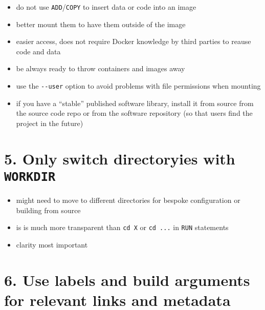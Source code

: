\documentclass[10pt,letterpaper]{article}
\providecommand{\tightlist}{%
  \setlength{\itemsep}{0pt}\setlength{\parskip}{0pt}}
\begin{document}
\begin{itemize}
\tightlist
\item
  do not use \texttt{ADD}/\texttt{COPY} to insert data or code into an
  image
\item
  better mount them to have them outside of the image
\item
  easier access, does not require Docker knowledge by third parties to
  reause code and data
\item
  be always ready to throw containers and images away
\item
  use the \texttt{-\/-user} option to avoid problems with file
  permissions when mounting
\item
  if you have a ``stable'' published software library, install it from
  source from the source code repo or from the software repository (so
  that users find the project in the future)
\end{itemize}

\hypertarget{only-switch-directoryies-with-workdir}{%
\section*{\texorpdfstring{5. Only switch directoryies with
\texttt{WORKDIR}}{5. Only switch directoryies with WORKDIR}}\label{only-switch-directoryies-with-workdir}}

\begin{itemize}
\tightlist
\item
  might need to move to different directories for bespoke configuration
  or building from source
\item
  is is much more transparent than \texttt{cd\ X} or \texttt{cd\ ...} in
  \texttt{RUN} statements
\item
  clarity most important
\end{itemize}

\hypertarget{use-labels-and-build-arguments-for-relevant-links-and-metadata}{%
\section*{6. Use labels and build arguments for relevant links and
metadata}\label{use-labels-and-build-arguments-for-relevant-links-and-metadata}}
\end{document}
